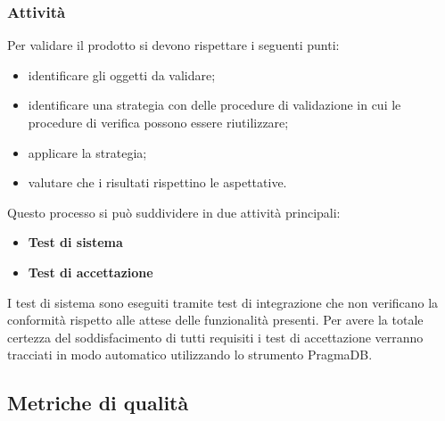 	\subsubsection{Attività}
	Per validare il prodotto si devono rispettare i seguenti punti:
	\begin{itemize}
		\item identificare gli oggetti da validare;
		\item identificare una strategia con delle procedure di validazione in cui le procedure di verifica possono essere riutilizzare;
		\item applicare la strategia;
		\item valutare che i risultati rispettino le aspettative.
	\end{itemize}
	Questo processo si può suddividere in due attività principali:
	\begin{itemize}
		\item \textbf{Test di sistema}
		\item \textbf{Test di accettazione}
	\end{itemize}
	I test di sistema sono eseguiti tramite test di integrazione che non verificano la conformità rispetto alle attese delle funzionalità presenti. Per avere la totale certezza del soddisfacimento di tutti requisiti i test di accettazione verranno tracciati in modo automatico utilizzando lo strumento PragmaDB.
	
	

\subsection{Metriche di qualità}

	

